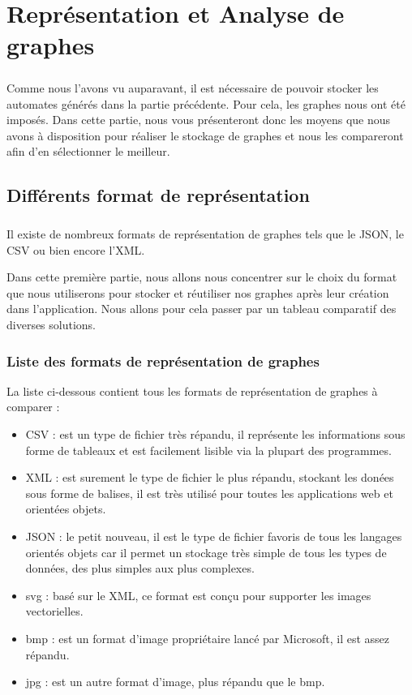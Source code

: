 \chapter{Représentation et Analyse de graphes}
\paragraph{}

Comme nous l'avons vu auparavant, il est nécessaire de pouvoir stocker les automates générés dans la partie précédente. Pour cela, les graphes nous ont été imposés. Dans cette partie, nous vous présenteront donc les moyens que nous avons à disposition pour réaliser le stockage de graphes et nous les compareront afin d'en sélectionner le meilleur.

\section{Différents format de représentation}
  \paragraph{}
  Il existe de nombreux formats de représentation de graphes tels que le JSON, le CSV ou bien encore l'XML.
  
  Dans cette première partie, nous allons nous concentrer sur le choix du format que nous utiliserons pour stocker et réutiliser nos graphes après leur création dans l'application.
  Nous allons pour cela passer par un tableau comparatif des diverses solutions.
  

  \subsection{Liste des formats de représentation de graphes}
  La liste ci-dessous contient tous les formats de représentation de graphes à comparer : 
  \begin{itemize}
   \item CSV : est un type de fichier très répandu, il représente les informations sous forme de tableaux et est facilement lisible via la plupart des programmes. 
   \item XML : est surement le type de fichier le plus répandu, stockant les donées sous forme de balises, il est très utilisé pour toutes les applications web et orientées objets. 
   \item JSON : le petit nouveau, il est le type de fichier favoris de tous les langages orientés objets car il permet un stockage très simple de tous les types de données, des plus simples aux plus complexes. 
   \item svg : basé sur le XML, ce format est conçu pour supporter les images vectorielles.
   \item bmp : est un format d'image propriétaire lancé par Microsoft, il est assez répandu.
   \item jpg : est un autre format d'image, plus répandu que le bmp.
  \end{itemize}

